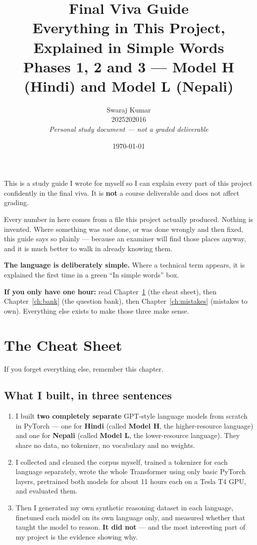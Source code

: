 \documentclass[11pt]{report}
\title{\Huge\textbf{Final Viva Guide}\\[0.3cm]
\Large Everything in This Project, Explained in Simple Words\\[0.2cm]
\large Phases 1, 2 and 3 --- Model H (Hindi) and Model L (Nepali)}
\author{Swaraj Kumar \\ \small 2025202016 \\[0.2cm]
\small \textit{Personal study document --- not a graded deliverable}}
\date{\today}
\newcommand{\MH}{\textcolor{hindiblue}{\textbf{Model H}}}
\newcommand{\ML}{\textcolor{nepalipurple}{\textbf{Model L}}}
\begin{document}
\maketitle

\begin{tcolorbox}[colback=gray!8,colframe=gray!50!black,title={\textbf{How to use this document}}]
This is a study guide I wrote for myself so I can explain every part of this
project confidently in the final viva. It is \textbf{not} a course deliverable
and does not affect grading.

Every number in here comes from a file this project actually produced. Nothing
is invented. Where something was \emph{not} done, or was done wrongly and then
fixed, this guide says so plainly --- because an examiner will find those places
anyway, and it is much better to walk in already knowing them.

\medskip
\textbf{The language is deliberately simple.} Where a technical term appears, it
is explained the first time in a green ``In simple words'' box.

\medskip
\textbf{If you only have one hour:} read Chapter~\ref{ch:cheat} (the cheat
sheet), then Chapter~\ref{ch:bank} (the question bank), then
Chapter~\ref{ch:mistakes} (mistakes to own). Everything else exists to make
those three make sense.
\end{tcolorbox}

\tableofcontents

\chapter{The Cheat Sheet}
\label{ch:cheat}

If you forget everything else, remember this chapter.

\section{What I built, in three sentences}

\begin{enumerate}[leftmargin=*]
\item I built \textbf{two completely separate} GPT-style language models from
      scratch in PyTorch --- one for \textbf{Hindi} (called \MH, the
      higher-resource language) and one for \textbf{Nepali} (called \ML, the
      lower-resource language). They share no data, no tokenizer, no vocabulary
      and no weights.
\item I collected and cleaned the corpus myself, trained a tokenizer for each
      language separately, wrote the whole Transformer using only basic PyTorch
      layers, pretrained both models for about 11 hours each on a Tesla T4 GPU,
      and evaluated them.
\item Then I generated my own synthetic reasoning dataset in each language,
      finetuned each model on its own language only, and measured whether that
      taught the model to reason. \textbf{It did not} --- and the most
      interesting part of my project is the evidence showing why.
\end{enumerate}
\end{document}
